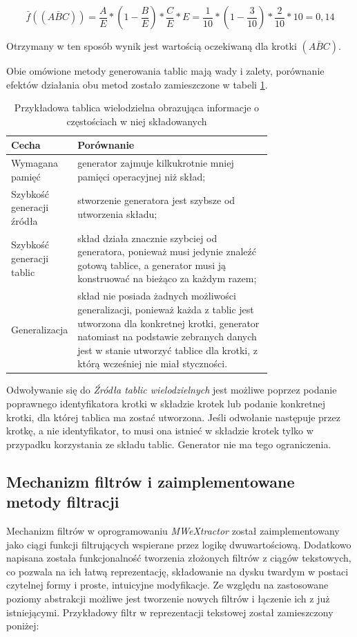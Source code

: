 \documentclass[11pt,a4paper]{llncs}
\begin{document}
$$ \bar{f}((A \bar{B} C)) = \frac{A}{E} * (1 - \frac{B}{E}) * \frac{C}{E} * E = \frac{1}{10} * (1 - \frac{3}{10}) * \frac{2}{10} * 10 = 0,14 $$

Otrzymany w ten sposób wynik jest wartością oczekiwaną dla krotki $ (A \bar{B} C) $.


Obie omówione metody generowania tablic mają wady i zalety, porównanie efektów działania obu metod zostało zamieszczone w tabeli \ref{storage_vs_generator}.
\begin{table}[h!]
\centering
\begin{tabular}{l | p{0.75\linewidth}}
	\toprule
	Cecha	& Porównanie							\\
	\midrule
	Wymagana pamięć & generator zajmuje kilkukrotnie mniej pamięci operacyjnej niż skład;	\\
	Szybkość generacji źródła & stworzenie generatora jest szybsze od utworzenia składu;	\\
	Szybkość generacji tablic & skład działa znacznie szybciej od generatora, ponieważ musi jedynie znaleźć gotową tablice, a generator musi ją konstruować na bieżąco za każdym razem;	\\
	Generalizacja & skład nie posiada żadnych możliwości generalizacji, ponieważ każda z tablic jest utworzona dla konkretnej krotki, generator natomiast na podstawie zebranych danych jest w stanie utworzyć tablice dla krotki, z którą wcześniej nie miał styczności. \\	
	\bottomrule
\end{tabular}
\caption[Tablica wielodzielna dla krotki 3-elementowej]{Przykładowa tablica wielodzielna obrazująca informacje o częstościach w niej składowanych}
\label{storage_vs_generator}
\end{table}


Odwoływanie się do \emph{Źródła tablic wielodzielnych} jest możliwe poprzez podanie poprawnego identyfikatora krotki w składzie krotek lub podanie konkretnej krotki, dla której tablica ma zostać utworzona.
Jeśli odwołanie następuje przez krotkę, a nie identyfikator, to musi ona istnieć w składzie krotek tylko w przypadku korzystania ze składu tablic. Generator nie ma tego ograniczenia.


\subsection{Mechanizm filtrów i zaimplementowane metody filtracji}
Mechanizm filtrów w oprogramowaniu \emph{MWeXtractor} został zaimplementowany jako ciągi funkcji filtrujących wspierane przez logikę dwuwartościową.
Dodatkowo napisana została funkcjonalność tworzenia złożonych filtrów z ciągów tekstowych, co pozwala na ich łatwą reprezentację, składowanie na dysku twardym w postaci czytelnej formy i proste, intuicyjne modyfikacje.
Ze względu na zastosowane poziomy abstrakcji możliwe jest tworzenie nowych filtrów i łączenie ich z już istniejącymi. 
Przykładowy filtr w reprezentacji tekstowej został zamieszczony poniżej:
\end{document}

